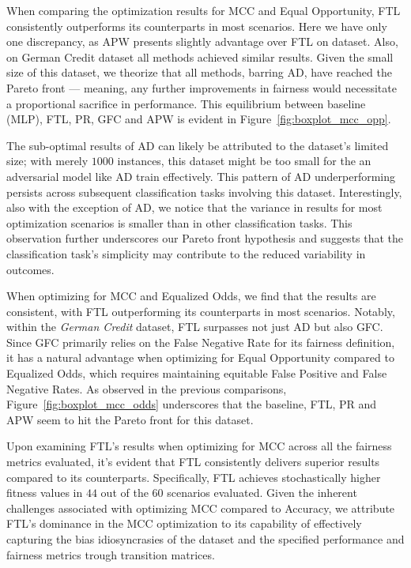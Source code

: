 When comparing the optimization results for MCC and Equal Opportunity, FTL consistently outperforms its counterparts in most scenarios. Here we have only one discrepancy, as APW presents slightly advantage over FTL on  dataset. Also, on German Credit dataset all methods achieved similar results. Given the small size of this dataset, we theorize that all methods, barring AD, have reached the Pareto front — meaning, any further improvements in fairness would necessitate a proportional sacrifice in performance. This equilibrium between baseline (MLP), FTL, PR, GFC and APW is evident in Figure~\ref{fig:boxplot_mcc_opp}. 

The sub-optimal results of AD can likely be attributed to the dataset's limited size; with merely $1000$ instances, this dataset might be too small for the an adversarial model like AD train effectively. This pattern of AD underperforming persists across subsequent classification tasks involving this dataset. Interestingly, also with the exception of AD, we notice that the variance in results for most optimization scenarios is smaller than in other classification tasks. This observation further underscores our Pareto front hypothesis and suggests that the classification task's simplicity may contribute to the reduced variability in outcomes.  

When optimizing for MCC and Equalized Odds, we find that the results are consistent, with FTL outperforming its counterparts in most scenarios. Notably, within the \textit{German Credit} dataset, FTL surpasses not just AD but also GFC. Since GFC primarily relies on the False Negative Rate for its fairness definition, it has a natural advantage when optimizing for Equal Opportunity compared to Equalized Odds, which requires maintaining equitable False Positive and False Negative Rates. As observed in the previous comparisons, Figure~\ref{fig:boxplot_mcc_odds} underscores that the baseline, FTL, PR and APW seem to hit the Pareto front for this dataset.

Upon examining FTL's results when optimizing for MCC across all the fairness metrics evaluated, it's evident that FTL consistently delivers superior results compared to its counterparts. Specifically, FTL achieves stochastically higher fitness values in $44$ out of the $60$ scenarios evaluated. Given the inherent challenges associated with optimizing MCC compared to Accuracy, we attribute FTL's dominance in the MCC optimization to its capability of effectively capturing the bias idiosyncrasies of the dataset and the specified performance and fairness metrics trough transition matrices.

